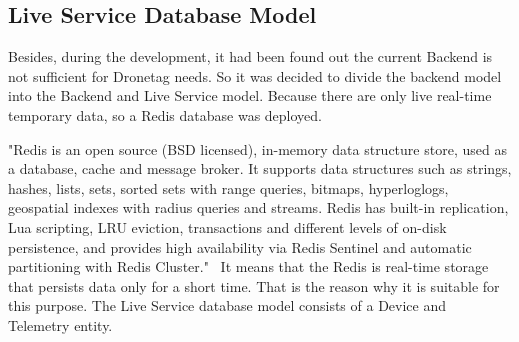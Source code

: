 \subsection{Live Service Database Model}\label{subsec:live-service-database-model}
Besides, during the development, it had been found out the current Backend is not sufficient for Dronetag needs.
So it was decided to divide the backend model into the Backend and Live Service model.
Because there are only live real-time temporary data, so a Redis database was deployed.

"Redis is an open source (BSD licensed), in-memory data structure store, used as a database, cache and message broker.
It supports data structures such as strings, hashes, lists, sets, sorted sets with range queries, bitmaps, hyperloglogs, geospatial indexes with radius queries and streams.
Redis has built-in replication, Lua scripting, LRU eviction, transactions and different levels of on-disk persistence, and provides high availability via Redis Sentinel and automatic partitioning with Redis Cluster."~\cite{redis}
It means that the Redis is real-time storage that persists data only for a short time.
That is the reason why it is suitable for this purpose.
The Live Service database model consists of a Device and Telemetry entity.

